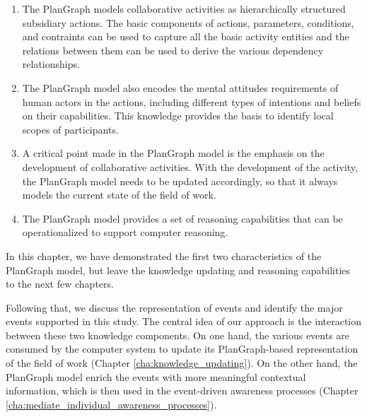 \begin{enumerate}
   \item The PlanGraph models collaborative activities as hierarchically structured subsidiary actions. The basic components of actions, parameters, conditions, and contraints can be used to capture all the basic activity entities and the relations between them can be used to derive the various dependency relationships. 
   \item The PlanGraph model also encodes the mental attitudes requirements of human actors in the actions, including different types of intentions and beliefs on their capabilities. This knowledge provides the basis to identify local scopes of participants. 
   \item A critical point made in the PlanGraph model is the emphasis on the development of collaborative activities. With the development of the activity, the PlanGraph model needs to be updated accordingly, so that it always models the current state of the field of work. 
   \item The PlanGraph model provides a set of reasoning capabilities that can be operationalized to support computer reasoning.  
\end{enumerate}

In this chapter, we have demonstrated the first two characteristics of the PlanGraph model, but leave the knowledge updating and reasoning capabilities to the next few chapters.

Following that, we discuss the representation of events and identify the major events supported in this study. The central idea of our approach is the interaction between these two knowledge components. On one hand, the various events are consumed by the computer system to update its PlanGraph-based representation of the field of work (Chapter \ref{cha:knowledge_updating}). On the other hand, the PlanGraph model enrich the events with more meaningful contextual information, which is then used in the event-driven awareness processes (Chapter \ref{cha:mediate_individual_awareness_processes}). 




 

